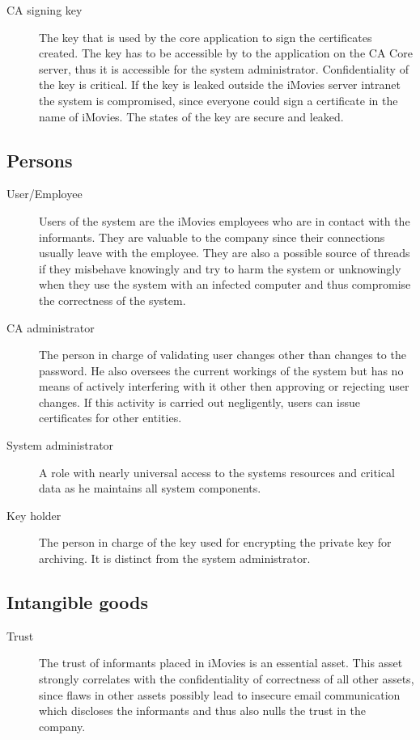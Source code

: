 \documentclass[a4paper, toc=index, 12pt, DIV14, twoside, BCOR2cm, headsepline, numbers=noenddot, bibliography=totoc]{scrbook}
\begin{document}
\begin{description}
\item[CA signing key] The key that is used by the core application to sign the certificates created. The key has to be accessible by to the application on the CA Core server, thus it is accessible for the system administrator. Confidentiality of the key is critical. If the key is leaked outside the iMovies server intranet the system is compromised, since everyone could sign a certificate in the name of iMovies. The states of the key are secure and leaked.
\end{description}
\subsection{Persons}
\begin{description}
\item[User/Employee ] Users of the system are the iMovies employees who are in contact with the informants. They are valuable to the company since their connections usually leave with the employee. They are also a possible source of threads if they misbehave knowingly and try to harm the system or unknowingly when they use the system with an infected computer and thus compromise the correctness of the system.
\item[CA administrator ] The person in charge of validating user changes other than changes to the password. He also oversees the current workings of the system but has no means of actively interfering with it other then approving or rejecting user changes. If this activity is carried out negligently, users can issue certificates for other entities.
\item[System administrator ] A role with nearly universal access to the systems resources and critical data as he maintains all system components.
\item[Key holder ] The person in charge of the key used for encrypting the private key for archiving. It is distinct from the system administrator.
\end{description}
\subsection{Intangible goods}
\begin{description}
\item[Trust ] The trust of informants placed in iMovies is an essential asset. This asset strongly correlates with the confidentiality of correctness of all other assets, since flaws in other assets possibly lead to insecure email communication which discloses the informants and thus also nulls the trust in the company.
\end{description}
\end{document}
